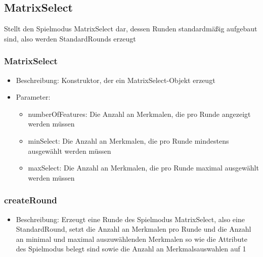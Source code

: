 \documentclass[a4paper]{scrreprt}
\begin{document}
	\subsection{MatrixSelect}
	Stellt den Spielmodus MatrixSelect dar, dessen Runden standardmäßig aufgebaut sind, also werden StandardRounds erzeugt
	\subsubsection{MatrixSelect}
	\begin{itemize}
		\item Beschreibung: Konstruktor, der ein MatrixSelect-Objekt erzeugt
		\item Parameter:
		\begin{itemize}
			\item numberOfFeatures: Die Anzahl an Merkmalen, die pro Runde angezeigt werden müssen
			\item minSelect: Die Anzahl an Merkmalen, die pro Runde mindestens ausgewählt werden müssen
			\item maxSelect: Die Anzahl an Merkmalen, die pro Runde maximal ausgewählt werden müssen
		\end{itemize}
	\end{itemize}
	\subsubsection{createRound}
	\begin{itemize}
		\item Beschreibung: Erzeugt eine Runde des Spielmodus MatrixSelect, also eine StandardRound, setzt die Anzahl an Merkmalen pro Runde und die Anzahl an minimal und maximal auszuwählenden Merkmalen so wie die Attribute des Spielmodus belegt sind sowie die Anzahl an Merkmalsauswahlen auf 1
	\end{itemize}
\end{document}
